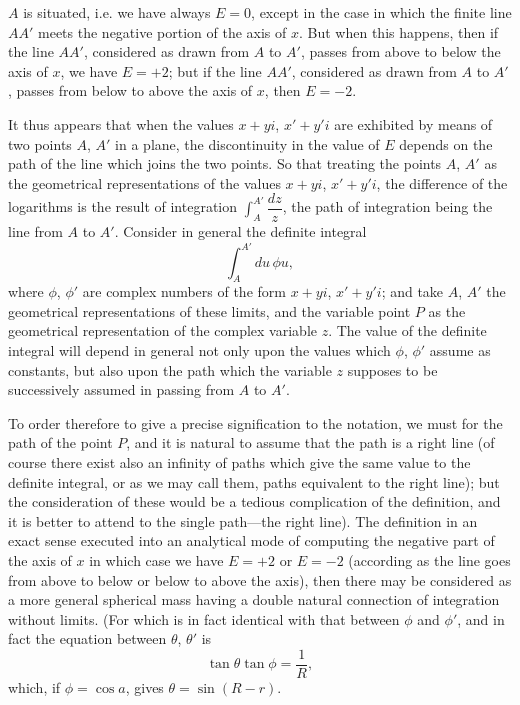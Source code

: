 \documentclass[12pt,a4paper]{article}
\theoremstyle{definition}
\begin{document}
\smallskip

$A$ is situated, i.e. we have always $E = 0$, except in the case in which the finite line
$AA'$ meets the negative portion of the axis of $x$. But when this happens, then if
the line $AA'$, considered as drawn from $A$ to $A'$, passes from above to below the
axis of $x$, we have $E = +2$; but if the line $AA'$, considered as drawn from $A$ to $A'$,
passes from below to above the axis of $x$, then $E = -2$.

\medskip

It thus appears that when the values $x+yi$, $x'+y'i$ are exhibited by means of two
points $A$, $A'$ in a plane, the discontinuity in the value of $E$ depends on the path of
the line which joins the two points. So that treating the points $A$, $A'$ as the geometrical
representations of the values $x+yi$, $x'+y'i$, the difference of the logarithms is
the result of integration $\int_A^{A'}\dfrac{dz}{z}$, the path of integration being the line from $A$ to $A'$.
Consider in general the definite integral
\[
\int_A^{A'} d u \, \phi u,
\]
where $\phi$, $\phi'$ are complex numbers of the form $x+yi$, $x'+y'i$; and take $A$, $A'$ the geometrical
representations of these limits, and the variable point $P$ as the geometrical
representation of the complex variable $z$. The value of the definite integral will
depend in general not only upon the values which $\phi$, $\phi'$ assume as constants, but also
upon the path which the variable $z$ supposes to be successively assumed in passing from
$A$ to $A'$.

\medskip

To order therefore to give a precise signification to the notation, we must for the
path of the point $P$, and it is natural to assume that the path is a right line (of
course there exist also an infinity of paths which give the same value to the definite
integral, or as we may call them, paths equivalent to the right line); but the consideration
of these would be a tedious complication of the definition, and it is better to attend to the
single path---the right line). The definition in an exact sense
executed into an analytical mode of computing the negative part of the axis of $x$ in
which case we have $E = +2$ or $E = -2$ (according as the line goes from above to
below or below to above the axis), then there may be considered as a more general
spherical mass having a double natural connection of integration without limits. (For
which is in fact identical with that between $\phi$ and $\phi'$, and in fact the equation between
$\theta$, $\theta'$ is
\[
\tan\theta\tan\phi = \frac{1}{R},
\]
which, if $\phi = \cos a$, gives $\theta = \sin (R - r)$.
\end{document}
